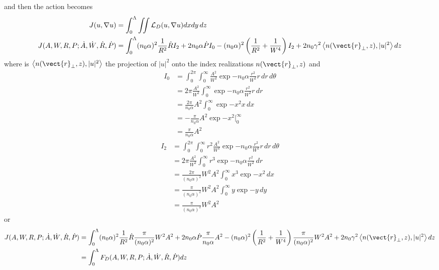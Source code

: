 and then the action becomes
\begin{equation}
    \begin{split}
        J(u,\nabla u) &= \int_{0}^{\Lambda} \iint \mathcal{L}_{D}(u,\nabla u) dx dy \, dz\\
        J(A,W,R,P;\dot{A},\dot{W},\dot{R},\dot{P}) &= \int_{0}^{\Lambda} (n_0 \alpha)^2 \frac{1}{ R^2} \dot{R} I_2 + 2 n_0 \alpha \dot{P} I_0 - (n_0 \alpha)^2 \left(\frac{1}{R^2} + \frac{1}{W^4}\right) I_2 + 2n_0 \gamma^2 \left<n(\vect{r}_{\perp},z), |u|^2\right>  dz\\ 
    \end{split}
\end{equation}
where is $\left<n(\vect{r}_{\perp},z), |u|^2\right>$ the projection of $|u|^2$ onto the index realizations $n(\vect{r}_{\perp},z)$ and 
\begin{equation}
    \begin{split}
        I_0 &=  \int_{0}^{2\pi} \int_{0}^{\infty} \frac{A^2}{W^2} \exp{-n_0 \alpha \frac{r^2 }{W^2}} r \,dr \,d\theta \\
        &=  2\pi \frac{A^2}{W^2} \int_{0}^{\infty}  \exp{-n_0 \alpha \frac{r^2}{W^2}} r \,dr \\
        &=  \frac{2\pi}{n_0 \alpha} A^2 \int_{0}^{\infty}  \exp{-x^2} x \,dx \\
        &= -\frac{\pi}{n_0 \alpha} A^2 \exp{-x^2}\big|_{0}^{\infty} \\
        &= \frac{\pi}{n_0 \alpha} A^2 
    \end{split}
\end{equation}
\begin{equation}
    \begin{split}
      I_2 &=  \int_{0}^{2\pi} \int_{0}^{\infty} r^2 \frac{A^2}{W^2} \exp{-n_0 \alpha \frac{r^2 }{W^2}} r \,dr \,d\theta\\           
          &= 2\pi\frac{A^2}{W^2} \int_{0}^{\infty} r^3 \exp{-n_0 \alpha \frac{r^2 }{W^2}} \,dr \\
          &= \frac{2\pi}{(n_0 \alpha)^2} W^2 A^2 \int_{0}^{\infty} x^3 \exp{-x^2} \,dx \\
          &= \frac{\pi}{(n_0 \alpha)^2} W^2 A^2 \int_{0}^{\infty} y \exp{-y} \,dy  \\
          &= \frac{\pi}{(n_0 \alpha)^2} W^2 A^2
    \end{split}
\end{equation}
or
\begin{equation}
    \begin{split}
        J(A,W,R,P;\dot{A},\dot{W},\dot{R},\dot{P}) &= \int_{0}^{\Lambda} (n_0 \alpha)^2 \frac{1}{ R^2} \dot{R} \frac{\pi}{(n_0 \alpha)^2} W^2 A^2 + 2 n_0 \alpha \dot{P} \frac{\pi}{n_0 \alpha} A^2 - (n_0 \alpha)^2 \left(\frac{1}{R^2} + \frac{1}{W^4}\right) \frac{\pi}{(n_0 \alpha)^2} W^2 A^2 + 2n_0 \gamma^2 \left<n(\vect{r}_{\perp},z), |u|^2\right>  dz\\ 
    &=\int_{0}^{\Lambda} F_{D}(A,W,R,P;\dot{A},\dot{W},\dot{R},\dot{P})  dz\\
    \end{split}
\end{equation}
